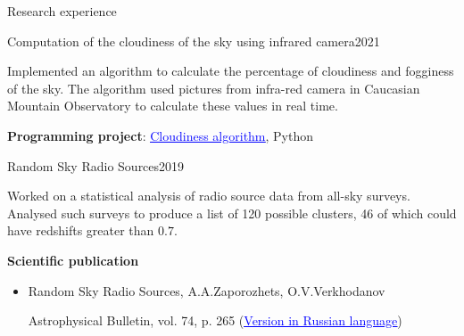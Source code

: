 \documentclass{resume} %
\newcommand{\link}[2]{\href{#1}{\textcolor{blue}{\underline{#2}}}}
\newcommand{\subheader}[2]{
	{\textbf{#1}} \ifthenelse{\equal{#2}{}}{}{\timestamp{#2}}
}
\begin{document}
\begin{rSection}{Research experience}
		\begin{rSubsection}{Computation of the cloudiness of the sky using infrared camera}{2021}{}{}{}
			\item Implemented an algorithm to calculate the percentage of cloudiness and fogginess of the sky. The algorithm used pictures from infra-red camera in Caucasian Mountain Observatory to calculate these values in real time.
			\item \textbf{Programming project}: \link{https://github.com/Kraysent/cloudiness}{Cloudiness algorithm}, Python 
		\end{rSubsection}

		\begin{rSubsection}{Random Sky Radio Sources}{2019}{}{}{}
			\item Worked on a statistical analysis of radio source data from all-sky surveys. Analysed such surveys to produce a list of 120 possible clusters, 46 of which could have redshifts greater than $0.7$.
			\item \subheader{Scientific publication}{}
			\begin{itemize}
				\item Random Sky Radio Sources, A.A.Zaporozhets, O.V.Verkhodanov 

				Astrophysical Bulletin, vol. 74, p. 265 (\link{http://www.sao.ru/Doc-k8/Science/Public/Bulletin/Vol74/N3/ASPB265.pdf}{Version in Russian language})
			\end{itemize}	
		\end{rSubsection}
	\end{rSection}
\end{document}
